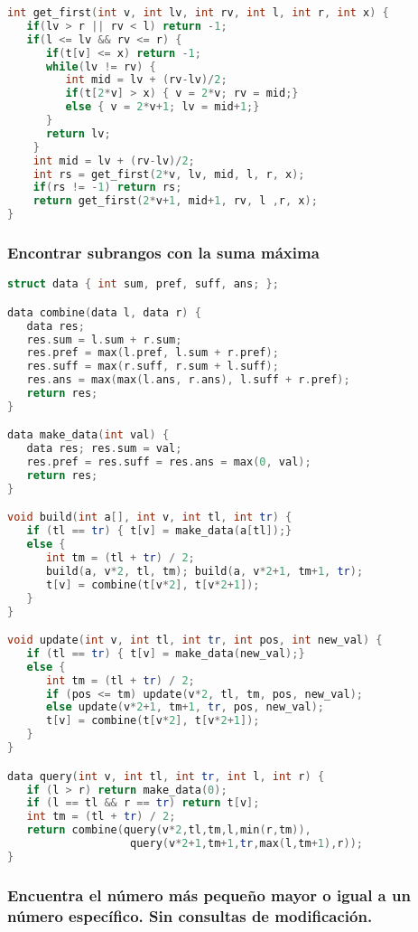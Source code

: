 \begin{lstlisting}[language=C++]
int get_first(int v, int lv, int rv, int l, int r, int x) {
   if(lv > r || rv < l) return -1;
   if(l <= lv && rv <= r) {
      if(t[v] <= x) return -1;
      while(lv != rv) {
         int mid = lv + (rv-lv)/2;
         if(t[2*v] > x) { v = 2*v; rv = mid;}
         else { v = 2*v+1; lv = mid+1;}
      }
      return lv;
    }
    int mid = lv + (rv-lv)/2;
    int rs = get_first(2*v, lv, mid, l, r, x);
    if(rs != -1) return rs;
    return get_first(2*v+1, mid+1, rv, l ,r, x);
}
\end{lstlisting}

\subsubsection{Encontrar subrangos con la suma máxima}
\begin{lstlisting}[language=C++]
struct data { int sum, pref, suff, ans; };

data combine(data l, data r) {
   data res;
   res.sum = l.sum + r.sum;
   res.pref = max(l.pref, l.sum + r.pref);
   res.suff = max(r.suff, r.sum + l.suff);
   res.ans = max(max(l.ans, r.ans), l.suff + r.pref);
   return res;
}

data make_data(int val) {
   data res; res.sum = val;
   res.pref = res.suff = res.ans = max(0, val);
   return res;
}

void build(int a[], int v, int tl, int tr) {
   if (tl == tr) { t[v] = make_data(a[tl]);} 
   else {
      int tm = (tl + tr) / 2;
      build(a, v*2, tl, tm); build(a, v*2+1, tm+1, tr);
      t[v] = combine(t[v*2], t[v*2+1]);
   }
}

void update(int v, int tl, int tr, int pos, int new_val) {
   if (tl == tr) { t[v] = make_data(new_val);} 
   else { 
      int tm = (tl + tr) / 2;
      if (pos <= tm) update(v*2, tl, tm, pos, new_val);
      else update(v*2+1, tm+1, tr, pos, new_val); 
      t[v] = combine(t[v*2], t[v*2+1]);
   }
}

data query(int v, int tl, int tr, int l, int r) {
   if (l > r) return make_data(0);
   if (l == tl && r == tr) return t[v];
   int tm = (tl + tr) / 2;
   return combine(query(v*2,tl,tm,l,min(r,tm)),
                   query(v*2+1,tm+1,tr,max(l,tm+1),r));
}

\end{lstlisting}

\subsubsection{Encuentra el número más pequeño mayor o igual a un número específico. Sin consultas de modificación.}

